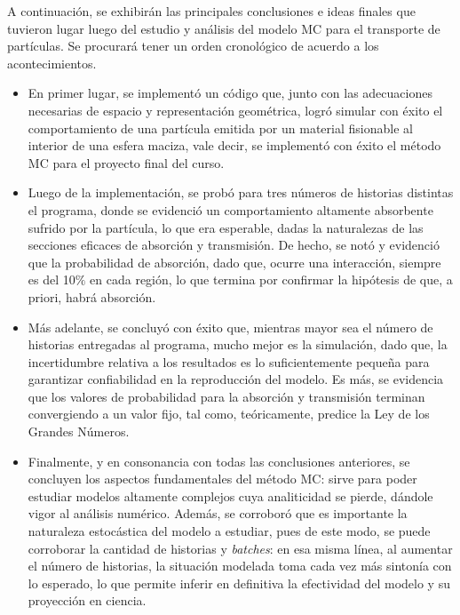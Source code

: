 
A continuación, se exhibirán las principales conclusiones e ideas finales que tuvieron lugar luego del estudio y análisis del modelo MC para el transporte de partículas. Se procurará tener un orden cronológico de acuerdo a los acontecimientos.

\begin{itemize}
\item En primer lugar, se implementó un código que, junto con las adecuaciones necesarias de espacio y representación geométrica, logró simular con éxito el comportamiento de una partícula emitida por un material fisionable al interior de una esfera maciza, vale decir, se implementó con éxito el método MC para el proyecto final del curso. 
\item Luego de la implementación, se probó para tres números de historias distintas el programa, donde se evidenció un comportamiento altamente absorbente sufrido por la partícula, lo que era esperable, dadas la naturalezas de las secciones eficaces de absorción y transmisión. De hecho, se notó y evidenció que la probabilidad de absorción, dado que, ocurre una interacción, siempre es del 10$\%$ en cada región, lo que termina por confirmar la hipótesis de que, a priori, habrá absorción.
\item Más adelante, se concluyó con éxito que, mientras mayor sea el número de historias entregadas al programa, mucho mejor es la simulación, dado que, la incertidumbre relativa a los resultados es lo suficientemente pequeña para garantizar confiabilidad en la reproducción del modelo. Es más, se evidencia que los valores de probabilidad para la absorción y transmisión terminan convergiendo a un valor fijo, tal como, teóricamente, predice la Ley de los Grandes Números.
\item Finalmente, y en consonancia con todas las conclusiones anteriores, se concluyen los aspectos fundamentales del método MC: sirve para poder estudiar modelos altamente complejos cuya analiticidad se pierde, dándole vigor al análisis numérico. Además, se corroboró que es importante la naturaleza estocástica del modelo a estudiar, pues de este modo, se puede corroborar la cantidad de historias y \emph{batches}: en esa misma línea, al aumentar el número de historias, la situación modelada toma cada vez más sintonía con lo esperado, lo que permite inferir en definitiva la efectividad del modelo y su proyección en ciencia.
\end{itemize}



